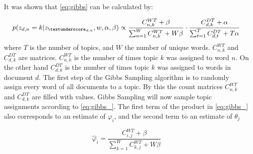 \documentclass[a4paper,ngerman, english]{atseminar}
\begin{document}
It was shown \cite{griffiths2004finding} that \autoref{eq:gibbs} can be calculated by:

\begin{equation} \label{eq:gibbs_}
p(z_{d,n} = k | z_{\textunderscore_ {d,n}},w,\alpha, \beta) \propto \frac{C_{n,k}^{WT}+\beta}
{\sum_{n=1}^{W}C_{n,k}^{WT}+W\beta} \cdot \frac{C_{d,k}^{DT}+\alpha}{\sum_{t=1}^{T}C_{d,t}^{DT}+T\alpha}
\end{equation}
where $T$ is the number of topics, and $W$ the number of unique words.
$C_{n,k}^{WT}$ and $C_{d,k}^{DT}$ are matrices. $C_{n,k}^{WT}$ is the number of times topic $k$ was assigned to 
word $n$. On the other hand $C_{d,k}^{DT}$ is the number of times topic $k$ was assigned to words in document $d$.
\noindent
The first step of the Gibbs Sampling algorithm is to randomly assign every word of all documents to a topic. By this 
the count matrices $C_{n,k}^{WT}$ and $C_{d,k}^{DT}$ are filled with values.
Gibbs Sampling will now sample topic assignments according to \autoref{eq:gibbs_}.
\noindent
The first term of the product in \autoref{eq:gibbs_} also corresponds to an estimate of $\varphi_i$, 
and the second term to an estimate of $\theta_j$

\begin{equation}
\hat{\varphi}_i = \frac{C_{i,j}^{WT}+\beta} {\sum_{k=1}^{W}C_{k,j}^{WT}+W\beta}
\end{equation}
\end{document}
